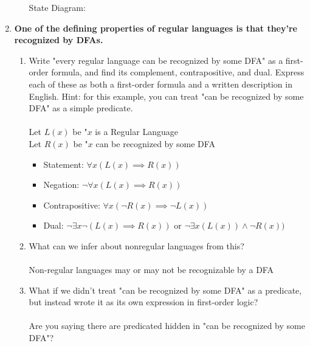 \begin{enumerate}
\begin{enumerate}
  State Diagram:\\
\end{enumerate}


\newpage
\item \textbf{One of the defining properties of regular languages is that they're recognized by DFAs.}
\begin{enumerate}
  \item Write "every regular language can be recognized by some DFA" as a first-order formula, and find its complement, contrapositive, and dual. Express each of these as both a first-order formula and a written description in English. Hint: for this example, you can treat "can be recognized by some DFA" as a simple predicate.
  \\
  \\ Let $L(x)$ be "$x$ is a Regular Language
  \\ Let $R(x)$ be "$x$ can be recognized by some DFA
  \begin{itemize}
  	\item Statement:  $\forall x ( L(x) \implies R(x))$
  	\item Negation: $\neg \forall x ( L(x) \implies R(x))$ 
   	\item Contrapositive: $\forall x ( \neg R(x) \implies \neg L(x))$
   	\item Dual: $\neg \exists x \neg ( L(x) \implies R(x))$ or $\neg \exists x (L(x)) \wedge \neg R(x))$
  \end{itemize}
  \item What can we infer about nonregular languages from this?
  \\\\
  Non-regular languages may or may not be recognizable by a DFA
  \item What if we didn't treat "can be recognized by some DFA" as a predicate, but instead wrote it as its own expression in first-order logic?
  \\ \\ Are you saying there are predicated hidden in "can be recognized by some DFA"?
\end{enumerate}
		
\end{enumerate}


